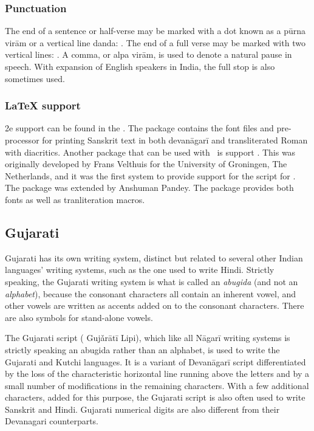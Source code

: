 \subsubsection{Punctuation} 
The end of a sentence or half-verse may be marked with a dot known as a pūrna virām or a vertical line danda: \textbar. The end of a full verse may be marked with two vertical lines: \textbar\textbar. A comma, or alpa virām, is used to denote a natural pause in speech. With expansion of English speakers in India, the full stop is also sometimes used.

\subsubsection{LaTeX support}
\latex2e support can be found in the . The package contains the font files and pre-processor for printing Sanskrit
text in both devanāgarī and transliterated Roman with diacritics. Another package that can be used with \XeTeX\ is support .  This was originally developed by Frans Velthuis for the University of Groningen, The Netherlands, and it was the first system to provide
support for the script for \tex. The package was  extended by Anshuman Pandey. The package provides both fonts as well as tranliteration macros.


\subsection{Gujarati}


Gujarati has its own writing system, distinct but related to several other Indian languages' writing systems, such as the one used to write Hindi. Strictly speaking, the Gujarati writing system is what is called an \emph{abugida} (and not an \textit{alphabet}), because the consonant characters all contain an inherent vowel, and other vowels are written as accents added on to the consonant characters. There are also symbols for stand-alone vowels.

The Gujarati script ({} Gujǎrātī Lipi), which like all Nāgarī writing systems is strictly speaking an abugida rather than an alphabet, is used to write the Gujarati and Kutchi languages. It is a variant of Devanāgarī script differentiated by the loss of the characteristic horizontal line running above the letters and by a small number of modifications in the remaining characters.
With a few additional characters, added for this purpose, the Gujarati script is also often used to write Sanskrit and Hindi.
Gujarati numerical digits are also different from their Devanagari counterparts.
\medskip

